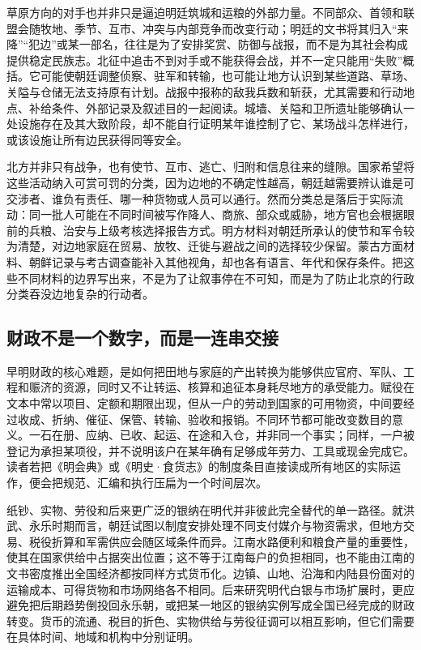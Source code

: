 草原方向的对手也并非只是逼迫明廷筑城和运粮的外部力量。不同部众、首领和联盟会随牧地、季节、互市、冲突与内部竞争而改变行动；明廷的文书将其归入“来降”“犯边”或某一部名，往往是为了安排奖赏、防御与战报，而不是为其社会构成提供稳定民族志。北征中追击不到对手或不能获得会战，并不一定只能用“失败”概括。它可能使朝廷调整侦察、驻军和转输，也可能让地方认识到某些道路、草场、关隘与仓储无法支持原有计划。战报中报称的敌我兵数和斩获，尤其需要和行动地点、补给条件、外部记录及叙述目的一起阅读。城墙、关隘和卫所遗址能够确认一处设施存在及其大致阶段，却不能自行证明某年谁控制了它、某场战斗怎样进行，或该设施让所有边民获得同等安全。

北方并非只有战争，也有使节、互市、逃亡、归附和信息往来的缝隙。国家希望将这些活动纳入可赏可罚的分类，因为边地的不确定性越高，朝廷越需要辨认谁是可交涉者、谁负有责任、哪一种货物或人员可以通行。然而分类总是落后于实际流动：同一批人可能在不同时间被写作降人、商旅、部众或威胁，地方官也会根据眼前的兵粮、治安与上级考核选择报告方式。明方材料对朝廷所承认的使节和军令较为清楚，对边地家庭在贸易、放牧、迁徙与避战之间的选择较少保留。蒙古方面材料、朝鲜记录与考古调查能补入其他视角，却也各有语言、年代和保存条件。把这些不同材料的边界写出来，不是为了让叙事停在不可知，而是为了防止北京的行政分类吞没边地复杂的行动者。

\subsection{财政不是一个数字，而是一连串交接}

早明财政的核心难题，是如何把田地与家庭的产出转换为能够供应官府、军队、工程和赈济的资源，同时又不让转运、核算和追征本身耗尽地方的承受能力。赋役在文本中常以项目、定额和期限出现，但从一户的劳动到国家的可用物资，中间要经过收成、折纳、催征、保管、转输、验收和报销。不同环节都可能改变数目的意义。一石在册、应纳、已收、起运、在途和入仓，并非同一个事实；同样，一户被登记为承担某项役，并不说明该户在某年确有足够成年劳力、工具或现金完成它。读者若把《明会典》或《明史·食货志》的制度条目直接读成所有地区的实际运作，便会把规范、汇编和执行压扁为一个时间层次。

纸钞、实物、劳役和后来更广泛的银纳在明代并非彼此完全替代的单一路径。就洪武、永乐时期而言，朝廷试图以制度安排处理不同支付媒介与物资需求，但地方交易、税役折算和军需供应会随区域条件而异。江南水路便利和粮食产量的重要性，使其在国家供给中占据突出位置；这不等于江南每户的负担相同，也不能由江南的文书密度推出全国经济都按同样方式货币化。边镇、山地、沿海和内陆县份面对的运输成本、可得货物和市场网络各不相同。后来研究明代白银与市场扩展时，更应避免把后期趋势倒投回永乐朝，或把某一地区的银纳实例写成全国已经完成的财政转变。货币的流通、税目的折色、实物供给与劳役征调可以相互影响，但它们需要在具体时间、地域和机构中分别证明。

